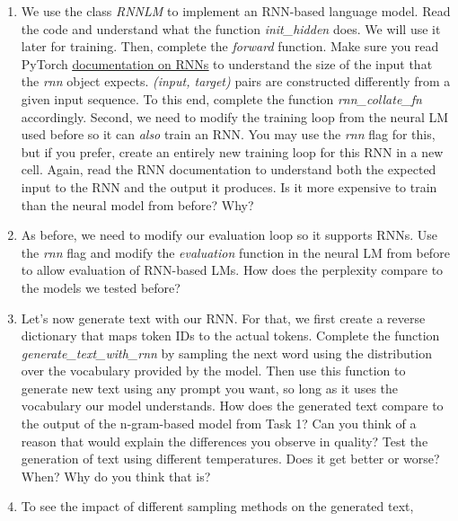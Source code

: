 \documentclass[11pt,a4paper]{article}
\begin{document}
\begin{enumerate}[label=(\alph*)]
    \item We use the class \emph{RNNLM} to implement an RNN-based language
          model.
          Read the code and understand what the function
          \emph{init\_hidden} does. We will use it later for training.
          Then, complete the \emph{forward} function.
          Make sure you read PyTorch
          \href{https://pytorch.org/docs/stable/generated/torch.nn.RNN.html}{\underline{documentation on RNNs}}
          to understand the size of the input that the \emph{rnn} object
          expects.
          \emph{(input, target)} pairs are constructed differently from a given
          input sequence.
          To this end, complete the function \emph{rnn\_collate\_fn}
          accordingly.
          Second, we need to modify the training loop from the neural LM used
          before so it can \emph{also} train an RNN.
          You may use the \emph{rnn} flag for this, but if you prefer, create an
          entirely new training loop for this RNN in a new cell.
          Again, read the RNN documentation to understand both the expected
          input to the RNN and the output it produces.
          Is it more expensive to train than the neural model from before? Why?
    \item As before, we need to modify our evaluation loop so it supports RNNs.
          Use the \emph{rnn} flag and modify the \emph{evaluation} function in
          the neural LM from before to allow evaluation of RNN-based LMs.
          How does the perplexity compare to the models we tested before?
    \item Let's now generate text with our RNN.
          For that, we first create a reverse dictionary that maps token IDs to
          the actual tokens.
          Complete the function \emph{generate\_text\_with\_rnn} by sampling the
          next word using the distribution over the vocabulary provided by the
          model.
          Then use this function to generate new text using any prompt you want,
          so long as it uses the vocabulary our model understands.
          How does the generated text compare to the output of the n-gram-based
          model from Task 1? Can you think of a reason that would explain the
          differences you observe in quality?
          Test the generation of text using different temperatures.
          Does it get better or worse? When? Why do you think that is?
    \item To see the impact of different sampling methods on the generated text,

\end{enumerate}
\end{document}
